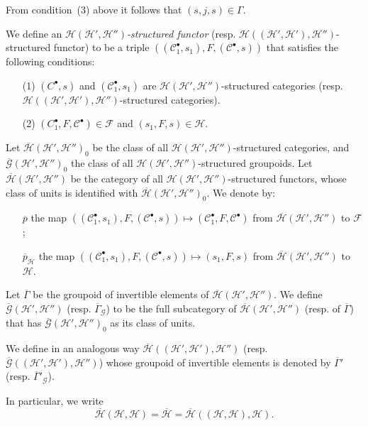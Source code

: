 \documentclass[a4paper,fleqn]{article}
\theoremstyle{plain}
\theoremstyle{definition}
\newenvironment{definition}[1]
  {\renewcommand\theinnerdefinition{#1}\innerdefinition}
  {\endinnerdefinition}
\newcommand{\CC}{\mathcal{C}}
\newcommand{\HH}{\mathcal{H}}
\newcommand{\bHH}{\overline{\HH}}
\newcommand{\FF}{\mathcal{F}}
\newcommand{\GG}{\mathcal{G}}
\newcommand{\smallbullet}{\bullet}
\begin{document}
From condition~(3) above it follows that $(s,j,s)\in\Gamma$.

\begin{definition}{5}
\label{definition:ii-5}
  We define an \emph{$\HH(\HH',\HH'')$-structured functor} (resp. $\HH((\HH',\HH'),\HH'')$-structured functor) to be a triple $((\CC_1^\smallbullet,s_1),F,(\CC^\smallbullet,s))$ that satisfies the following conditions:
  \begin{enumerate}
    \item[\normalfont(1)]
      $(C^\smallbullet,s)$ and $(\CC_1^\smallbullet,s_1)$ are $\HH(\HH',\HH'')$-structured categories (resp. $\HH((\HH',\HH'),\HH'')$-structured categories).

    \item[\normalfont(2)]
      $(C_1^\smallbullet,F,\CC^\smallbullet)\in\FF$ and $(s_1,F,s)\in\HH$.
  \end{enumerate}
\end{definition}

Let $\bHH(\HH',\HH'')_0$ be the class of all $\HH(\HH',\HH'')$-structured categories, and $\overline{\GG}(\HH',\HH'')_0$ the class of all $\HH(\HH',\HH'')$-structured groupoids.
Let $\bHH(\HH',\HH'')$ be the category of all $\HH(\HH',\HH'')$-structured functors, whose class of units is identified with $\bHH(\HH',\HH'')_0$.
We denote by:
\begin{itemize}
  \item[]
    $\overline{p}$ the map $((\CC_1^\smallbullet,s_1),F,(\CC^\smallbullet,s))\mapsto(\CC_1^\smallbullet,F,\CC^\smallbullet)$ from $\bHH(\HH',\HH'')$ to $\FF$;

  \item[]
    $\overline{p}_\HH$ the map $((\CC_1^\smallbullet,s_1),F,(\CC^\smallbullet,s))\mapsto(s_1,F,s)$ from $\bHH(\HH',\HH'')$ to $\HH$.
\end{itemize}

Let $\overline{\Gamma}$ be the groupoid of invertible elements of $\bHH(\HH',\HH'')$.
We define $\overline{\GG}(\HH',\HH'')$ (resp. $\overline{\Gamma}_\GG$) to be the full subcategory of $\bHH(\HH',\HH'')$ (resp. of $\overline{\Gamma}$) that has $\overline{\GG}(\HH',\HH'')_0$ as its class of units.

We define in an analogous way $\bHH((\HH',\HH'),\HH'')$ (resp. $\overline{\GG}((\HH',\HH'),\HH'')$) whose groupoid of invertible elements is denoted by $\overline{\Gamma}'$ (resp. $\overline{\Gamma}'_\GG$).

In particular, we write
\[
  \bHH(\HH,\HH)
  = \bHH
  = \bHH((\HH,\HH),\HH).
\]
\end{document}
